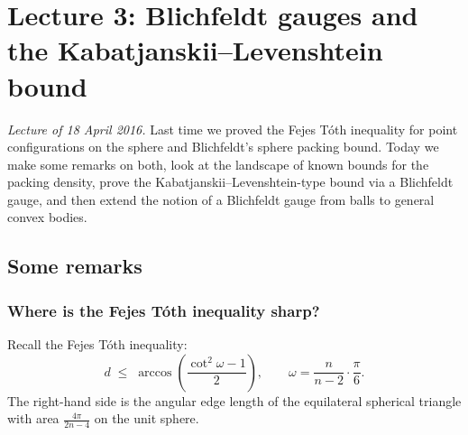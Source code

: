 \chapter[Lecture 3: Blichfeldt gauges, Kabatjanskii--Levenshtein]{Lecture 3: Blichfeldt gauges and the Kabatjanskii--Levenshtein bound}
\label{L3:ch}

\noindent\emph{Lecture of 18 April 2016.}
Last time we proved the Fejes T\'oth inequality for point configurations on the sphere and
Blichfeldt's sphere packing bound. Today we make some remarks on both, look at the landscape of
known bounds for the packing density, prove the Kabatjanskii--Levenshtein-type bound via a Blichfeldt
gauge, and then extend the notion of a Blichfeldt gauge from balls to general convex bodies.


\section{Some remarks}
\label{L3:sec:remarks}

\subsection*{Where is the Fejes T\'oth inequality sharp?}

Recall the Fejes T\'oth inequality: 
\begin{equation}\label{L3:eq:FT}
  d \;\le\; \arccos\!\left(\frac{\cot^2\omega-1}{2}\right),
  \qquad \omega=\frac{n}{n-2}\cdot\frac{\pi}{6}.
\end{equation}
%
The right-hand side is the angular edge length of the equilateral spherical triangle with area
$\frac{4\pi}{2n-4}$ on the unit sphere. 

